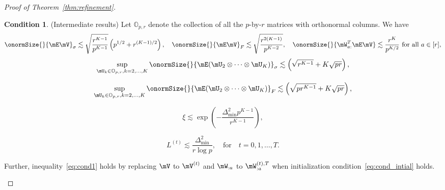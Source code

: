 \documentclass[lettersize,onecolumn,journal]{IEEEtran}
\theoremstyle{definition}
\theoremstyle{definition}
\newtheorem{condition}{Condition}
\newcommand{\of}[1]{\left(#1\right)}
\begin{document}
\begin{proof}[Proof of Theorem~\ref{thm:refinement}]
\begin{condition}(Intermediate results) \label{cond:origin} Let $\mathbb{O}_{p, r}$ denote the collection of all the $p$-by-$r$ matrices with orthonormal columns. We have 
\begin{equation}\label{eq:cond1}
    \onormSize{}{\mE \mV}_\sigma \lesssim \sqrt{\frac{r^{K-1}}{p^{K-1}}} \of{ p ^{1/2}+ r^{(K-1)/2}}, \quad \onormSize{}{\mE \mV}_F \lesssim \sqrt{\frac{ r^{2(K-1)}}{p^{K-2}}},\quad \onormSize{}{ \mW_{a:}^T \mE \mV} \lesssim \frac{r^K}{p^{K/2}} \text{ for all }a \in [r], 
\end{equation}
\begin{equation}\label{eq:cond2}
    \sup_{ \mU_k \in \mathbb{O}_{p, r}, k = 2,\ldots, K } \onormSize{}{ \mE (\mU_{2} \otimes \cdots \otimes \mU_K)}_\sigma \lesssim \of{ \sqrt{r^{K-1}} + K\sqrt{pr}},
\end{equation}

\begin{equation}\label{eq:cond3}
    \sup_{ \mU_k \in \mathbb{O}_{p, r}, k = 2,\ldots, K } \onormSize{}{ \mE (\mU_{2} \otimes \cdots \otimes \mU_K)}_F \lesssim \of{ \sqrt{pr^{K-1}} + K\sqrt{pr}},
\end{equation}

\begin{equation}\label{eq:cond_oracle}
    \xi \lesssim \exp\of{ - \frac{\Delta_{\min}^2 p^{K-1}}{r^{K-1}}},
\end{equation}

\begin{equation}\label{eq:cond_intial}
    L^{(t)} \lesssim \frac{\Delta_{\min}^2}{r \log p}, \quad \text{for} \quad t = 0, 1, \ldots, T.
\end{equation}
 
Further, inequality~\eqref{eq:cond1} holds by replacing $\mV$ to $\mV^{(t)}$ and $\mW_{:a}$ to $\mW_{:a}^{(t),T}$ when initialization condition~\eqref{eq:cond_intial} holds.
\end{condition}



\end{proof}
\end{document}
